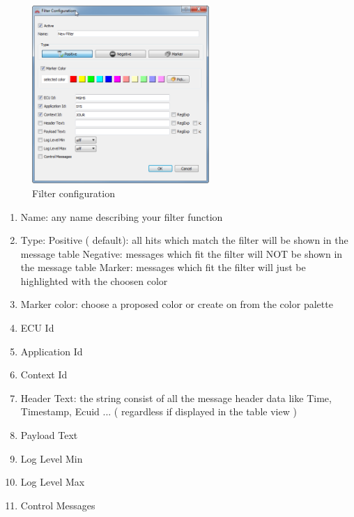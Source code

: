 \documentclass[a4paper,11pt]{article}
\begin{document}
\label{createfilter}
\begin{figure}[H]
 \centering
  \includegraphics[width=0.6\textwidth]{images/Filter_Configuration.png}
 \caption{Filter configuration}
 \label{fig:filterconfiguration}
\end{figure}


\begin{enumerate}
\item Name: any name describing your filter function
\item Type: \linebreak
      Positive ( default): all hits which match the filter will be shown in the message table\linebreak
      Negative: messages which fit the filter will NOT be shown in the message table\linebreak
      Marker: messages which fit the filter will just be highlighted with the choosen color\linebreak
\item Marker color: choose a proposed color or create on from the color palette
\item ECU Id
\item Application Id
\item Context Id
\item Header Text: the string consist of all the message header data like Time, Timestamp, Ecuid ...
      ( regardless if displayed in the table view )
\item Payload Text
\item Log Level Min
\item Log Level Max
\item Control Messages
\end{enumerate}
\end{document}
